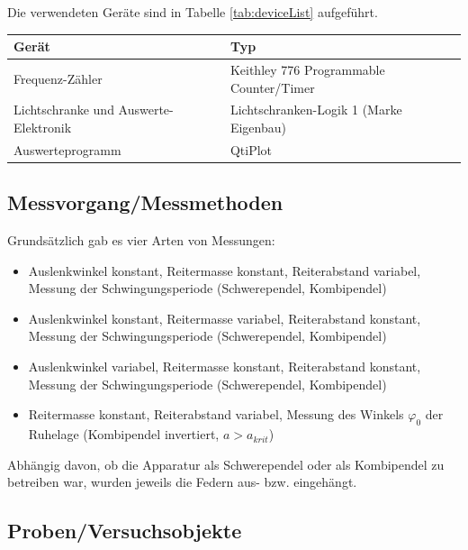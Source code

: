 Die verwendeten Ger\"ate sind in Tabelle \ref{tab:deviceList} aufgef\"uhrt.

\label{tab:deviceList}
\begin{tabular}{ll}
    \toprule
    Ger\"at & Typ \\
    \midrule
    Frequenz-Z\"ahler                     & Keithley 776 Programmable Counter/Timer \\
    Lichtschranke und Auswerte-Elektronik & Lichtschranken-Logik 1 (Marke Eigenbau) \\
    Auswerteprogramm                      & QtiPlot \\
    \bottomrule
\end{tabular}


\subsection{Messvorgang/Messmethoden}
\label{subsec:measurementMethods}

Grunds\"atzlich  gab es  vier Arten  von Messungen:
\begin{itemize}
    \item
        Auslenkwinkel konstant, Reitermasse konstant, Reiterabstand variabel, Messung der Schwingungsperiode (Schwerependel, Kombipendel)
    \item
        Auslenkwinkel konstant, Reitermasse variabel, Reiterabstand konstant, Messung der Schwingungsperiode (Schwerependel, Kombipendel)
    \item
        Auslenkwinkel variabel, Reitermasse konstant, Reiterabstand konstant, Messung der Schwingungsperiode (Schwerependel, Kombipendel)
    \item
        Reitermasse konstant, Reiterabstand variabel, Messung des Winkels $\varphi_0$ der Ruhelage (Kombipendel invertiert, $a>a_{krit}$)
\end{itemize}

Abh\"angig davon, ob  die Apparatur als Schwerependel oder  als Kombipendel zu
betreiben war, wurden jeweils die Federn aus- bzw. eingeh\"angt.

\subsection{Proben/Versuchsobjekte}
\label{subsec:samples}

